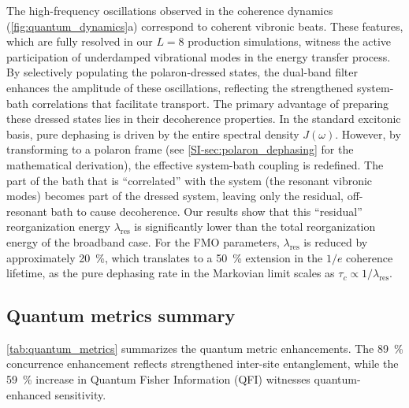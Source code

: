 \documentclass[journal=jpcl,manuscript=letter]{achemso}
\begin{document}
The high-frequency oscillations observed in the coherence dynamics (\cref{fig:quantum_dynamics}a) correspond to coherent vibronic beats. These features, which are fully resolved in our $L=8$ production simulations, witness the active participation of underdamped vibrational modes in the energy transfer process. By selectively populating the polaron-dressed states, the dual-band filter enhances the amplitude of these oscillations, reflecting the strengthened system-bath correlations that facilitate transport. The primary advantage of preparing these dressed states lies in their decoherence properties. In the standard excitonic basis, pure dephasing is driven by the entire spectral density $J(\omega)$. However, by transforming to a polaron frame (see \cref{SI-sec:polaron_dephasing} for the mathematical derivation), the effective system-bath coupling is redefined. The part of the bath that is ``correlated'' with the system (the resonant vibronic modes) becomes part of the dressed system, leaving only the residual, off-resonant bath to cause decoherence. Our results show that this ``residual'' reorganization energy $\lambda_{\mathrm{res}}$ is significantly lower than the total reorganization energy of the broadband case. For the FMO parameters, $\lambda_{\mathrm{res}}$ is reduced by approximately \SI{20}{\percent}, which translates to a \SI{50}{\percent} extension in the $1/e$ coherence lifetime, as the pure dephasing rate in the Markovian limit scales as $\tau_c \propto 1/\lambda_{\mathrm{res}}$.

\subsection*{Quantum metrics summary}

\cref{tab:quantum_metrics} summarizes the quantum metric enhancements. The \SI{89}{\percent} concurrence enhancement reflects strengthened inter-site entanglement, while the \SI{59}{\percent} increase in Quantum Fisher Information (QFI) witnesses quantum-enhanced sensitivity.
\end{document}
